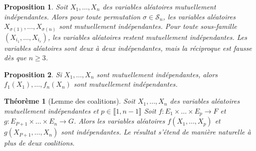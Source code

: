 \documentclass[french]{book}
\theoremstyle{plain}
\newtheorem{thm}{Théorème}[chapter]
\newtheorem{prop}{Proposition}[chapter]
\theoremstyle{definition}
\theoremstyle{remark}
\begin{document}
\begin{prop}
	Soit $X_1,\ldots,X_n$ des variables aléatoires mutuellement indépendantes. Alors pour toute permutation $\sigma\in\mathcal{S}_n$, les variables aléatoires $X_{\sigma(1)},\ldots,X_{\sigma(n)}$ sont mutuellement indépendantes. Pour toute sous-famille $(X_{i_1},\ldots,X_{i_r})$, les variables aléatoires restent mutuellement indépendantes. Les variables aléatoires sont deux à deux indépendantes, mais la réciproque est fausse dès que $n\geqslant3$.
\end{prop}
\begin{prop}
	Si $X_1,\ldots,X_n$ sont mutuellement indépendantes, alors $f_1(X_1),\ldots,f_n(X_n)$ sont mutuellement indépendantes.
\end{prop}
\begin{thm}[Lemme des coalitions]
	Soit $X_1,\ldots,X_n$ des variables aléatoires mutuellement indépendantes et $p\in\llbracket1,n-1\rrbracket$ Soit $f:E_1\times\ldots\times E_p \rightarrow F$ et $g:E_{P+1}\times\ldots\times E_n \rightarrow G$. Alors les variables aléatoires $f(X_1,\ldots,X_p)$ et $g(X_{P+1},\ldots,X_n)$ sont indépendantes. Le résultat s'étend de manière naturelle à plus de deux coalitions.
\end{thm}
\end{document}
